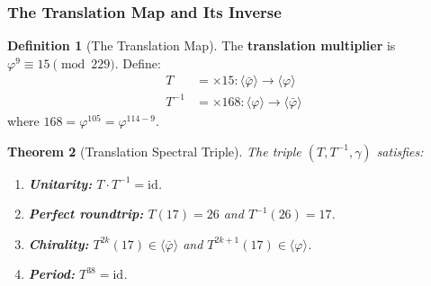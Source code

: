 \documentclass[12pt,oneside]{article}
\theoremstyle{principia}
\newtheorem{theorem}{Theorem}[section]
\theoremstyle{definition}
\newtheorem{definition}[theorem]{Definition}
\theoremstyle{remark}
\providecommand{\vp}{\varphi}
\providecommand{\vpbar}{\bar{\varphi}}
\begin{document}
\subsubsection*{The Translation Map and Its Inverse}

\begin{definition}[The Translation Map]\label{def:translation}
The \textbf{translation multiplier} is $\vp^9 \equiv 15 \pmod{229}$. Define:
\begin{align}
T &= \times 15 : \langle\vpbar\rangle \to \langle\vp\rangle \\
T^{-1} &= \times 168 : \langle\vp\rangle \to \langle\vpbar\rangle
\end{align}
where $168 = \vp^{105} = \vp^{114 - 9}$.
\end{definition}

\begin{theorem}[Translation Spectral Triple]\label{thm:spectral-triple}
The triple $(T, T^{-1}, \gamma)$ satisfies:
\begin{enumerate}
\item \textbf{Unitarity:} $T \cdot T^{-1} = \mathrm{id}$.
\item \textbf{Perfect roundtrip:} $T(17) = 26$ and $T^{-1}(26) = 17$.
\item \textbf{Chirality:} $T^{2k}(17) \in \langle\vpbar\rangle$ and $T^{2k+1}(17) \in \langle\vp\rangle$.
\item \textbf{Period:} $T^{38} = \mathrm{id}$.
\end{enumerate}
\end{theorem}
\end{document}
